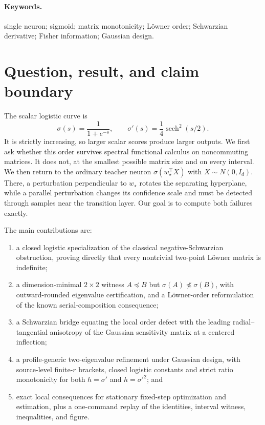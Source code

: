 \documentclass[11pt]{article}
\newcommand{\sech}{\operatorname{sech}}
\begin{document}
\paragraph{Keywords.} single neuron; sigmoid; matrix monotonicity; L\"owner order; Schwarzian derivative;
Fisher information; Gaussian design.

\section{Question, result, and claim boundary}

The scalar logistic curve is
\[
 \sigma(s)=\frac1{1+e^{-s}},\qquad
 \sigma'(s)=\frac1{4}\sech^2(s/2).
\]
It is strictly increasing, so larger scalar scores produce larger outputs.  We first ask whether this order survives
spectral functional calculus on noncommuting matrices.  It does not, at the smallest possible matrix size and on
every interval.  We then return to the ordinary teacher neuron $\sigma(w_\star^\top X)$ with
$X\sim N(0,I_d)$.  There, a perturbation perpendicular to $w_\star$ rotates the separating hyperplane, while a
parallel perturbation changes its confidence scale and must be detected through samples near the transition layer.
Our goal is to compute both failures exactly.

The main contributions are:
\begin{enumerate}[leftmargin=2em]
 \item a closed logistic specialization of the classical negative-Schwarzian obstruction, proving directly that
 every nontrivial two-point L\"owner matrix is indefinite;
 \item a dimension-minimal $2\times2$ witness $A\preceq B$ but $\sigma(A)\npreceq\sigma(B)$, with
 outward-rounded eigenvalue certification, and a L\"owner-order reformulation of the known serial-composition
 consequence;
 \item a Schwarzian bridge equating the local order defect with the leading radial--tangential anisotropy of the
 Gaussian sensitivity matrix at a centered inflection;
 \item a profile-generic two-eigenvalue refinement under Gaussian design, with source-level finite-$r$ brackets,
 closed logistic constants and strict ratio monotonicity for both $h=\sigma'$ and $h=\sigma'^2$; and
 \item exact local consequences for stationary fixed-step optimization and estimation, plus a one-command replay
 of the identities,
 interval witness, inequalities, and figure.
\end{enumerate}
\end{document}
